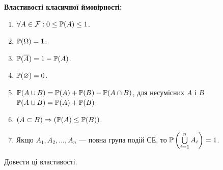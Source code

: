\noindent \textbf{Властивості класичної ймовірності:}
\begin{enumerate}
    \item $\forall A \in \mathcal{F}: 0 \leq \P(A) \leq 1$.
    \item $\P(\Omega) = 1$.
    \item $\P(\overline{A}) = 1 - \P(A)$.
    \item $\P(\varnothing) = 0$.
    \item $\P(A\cup B) = \P(A) + \P(B) - \P(A\cap B)$, для несумісних $A$ і $B$ $\P(A\cup B) = \P(A) + \P(B)$.
    \item $\left( A \subset B\right) \Rightarrow \left( \P(A) \leq \P(B)\right)$.
    \item Якщо $A_1, A_2, ..., A_n$ --- повна група подій СЕ, то $\P\left(\bigcup\limits_{i=1}^{n} A_i\right) = 1$.
\end{enumerate}

\begin{exercise}
    Довести ці властивості.
\end{exercise}

